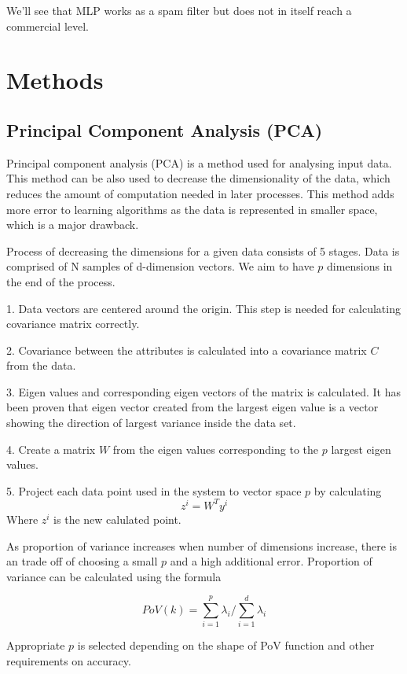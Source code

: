 We’ll see that MLP works as a spam filter but does not in itself reach a commercial level.



\section{Methods}

\subsection{Principal Component Analysis (PCA)}
\label{sec:pca}

Principal component analysis (PCA) \cite{wiki:pca} is a method used for analysing input data. This method can be also used to decrease the dimensionality of the data, which reduces the amount of computation needed in later processes. This method adds more error to learning algorithms as the data is represented in smaller space, which is a major drawback.

Process of decreasing the dimensions for a given data consists of 5 stages. Data is comprised of N samples of d-dimension vectors. We aim to have $p$ dimensions in the end of the process.

1. Data vectors are centered around the origin. This step is needed for calculating covariance matrix correctly.

2. Covariance between the attributes is calculated into a covariance matrix $C$ from the data.

3. Eigen values and corresponding eigen vectors of the matrix is calculated. It has been proven \cite{luentokalvo} that eigen vector created from the largest eigen value is a vector showing the direction of largest variance inside the data set.

4. Create a matrix $W$ from the eigen values corresponding to the $p$ largest eigen values.

5. Project each data point used in the system to vector space $p$ by calculating \[ z^i = W^Ty^i \] Where $z^i$ is the new calulated point.

As proportion of variance increases when number of dimensions increase, there is an trade off of choosing a small $p$ and a high additional error. Proportion of variance can be calculated using the formula

\[ PoV(k) = \sum_{i=1}^p\lambda_i/\sum_{i=1}^d\lambda_i \]

Appropriate $p$ is selected depending on the shape of PoV function and other requirements on accuracy.

